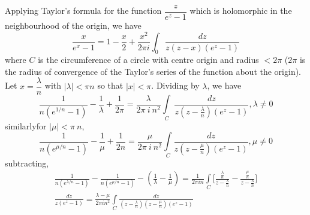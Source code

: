 Applying Taylor's formula for the function $\dfrac{z}{e^z -1}$ which
is holomorphic in the neighbourhood of the origin, we have 
$$
\frac{x}{e^x -1} = 1 - \frac{x}{2} + \frac{x^2}{2 \pi i} \int_0
\frac{dz}{z(z-x)(e^z -1)} 
$$
where $C$ is the circumference of a circle with centre origin and
radius $< 2 \pi $ ($2 \pi$ is the radius of convergence of the
Taylor's series of the function about the origin). Let $x =
\dfrac{\lambda}{n}$ with $| \lambda | < \pi n$ so that $| x | <
\pi$. Dividing by $\lambda$, we have 
$$
\frac{1}{n(e^{1/n}-1)} - \frac{ 1}{\lambda} + \frac{1}{2 \pi} =
\frac{\lambda}{2 \pi ~ i ~ n^2} \int\limits_C
~\frac{dz}{z(z-\frac{\lambda}{n})(e^z -1)}, \lambda \neq 0 
$$
similarly\pageoriginale for $| \mu | < \pi ~ n$,
$$
\frac{1}{n(e^{\mu/n}-1)} - \frac{1}{\mu} + \frac{1}{2n} = \frac{\mu}{2
  \pi ~ i ~n^2} \int\limits_C \frac{dz}{z(z- \frac{\mu}{n}) (e^z -1)},
\mu \neq 0 
$$
subtracting, 
\begin{multline*}
  \frac{1}{n(e^{\lambda/n}-1)} - \frac{1}{n(e^{\mu/n}-1)} -
  \left(\frac{1}{\lambda} - \frac{1}{\mu}\right) = \frac{1}{2 \pi  i n}
  \int\limits_C \Bigg[ \frac{\frac{\lambda}{n}}{z - \frac{\lambda}{n}}
    -\frac{ \frac{\mu}{n}} {z - \frac{\lambda}{n}} \Bigg]\\
  \frac{dz}{z(e^z -1)} = \frac{\lambda - \mu}{ 2 \pi in^2} \int\limits_C
  \frac{dz}{\left(z - \frac{\lambda}{n}\right)\left(z -
    \frac{\mu}{n}\right)(e^z -1)}  
\end{multline*}

